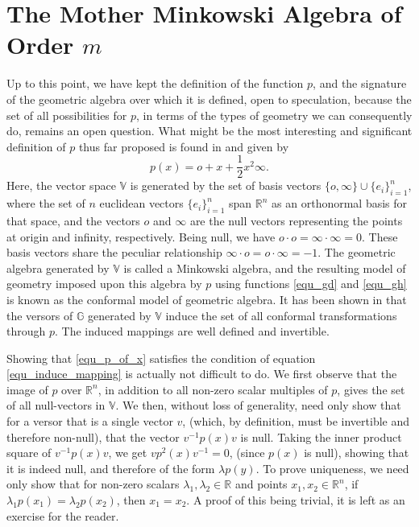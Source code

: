 \documentclass{birkjour}
\theoremstyle{definition}
\theoremstyle{remark}
\numberwithin{equation}{section}
\newcommand{\R}{\mathbb{R}}
\newcommand{\G}{\mathbb{G}}
\newcommand{\V}{\mathbb{V}}
\newcommand{\nvai}{\infty}
\newcommand{\nvao}{o}
\begin{document}
\section{The Mother Minkowski Algebra of Order $m$}

Up to this point, we have kept the definition of the function $p$, and the signature of the
geometric algebra over which it is defined,
open to speculation, because the set of all possibilities for $p$, in terms of the types of geometry
we can consequently do, remains an open question.  What might be the most interesting and significant
definition of $p$ thus far proposed is found in \cite{Hestenes01} and given by
\begin{equation}\label{equ_p_of_x}
p(x)=\nvao + x + \frac{1}{2}x^2\nvai.
\end{equation}
Here, the vector space $\V$ is generated by the set
of basis vectors $\{\nvao,\nvai\}\cup\{e_i\}_{i=1}^n$,
where the set of $n$ euclidean vectors $\{e_i\}_{i=1}^n$ span
$\R^n$ as an orthonormal basis for that space, and the
vectors $\nvao$ and $\nvai$ are the null vectors representing the
points at origin and infinity, respectively.  Being null, we have $\nvao\cdot\nvao=\nvai\cdot\nvai=0$.
These basis vectors share the peculiar relationship $\nvai\cdot\nvao=\nvao\cdot\nvai=-1$.  The geometric
algebra generated by $\V$ is called a Minkowski algebra, and the resulting model of
geometry imposed upon this algebra by $p$ using functions \eqref{equ_gd} and \eqref{equ_gh}
is known as the conformal model of geometric algebra.  It has been shown in
\cite{Hestenes01,LiRockwood01,Dorst07} that
the versors of $\G$ generated by $\V$ induce the set of all conformal transformations through $p$.
The induced mappings are well defined and invertible.

Showing that \eqref{equ_p_of_x} satisfies the condition of equation \eqref{equ_induce_mapping}
is actually not difficult to do.  We first observe that the image of $p$ over $\R^n$, in addition
to all non-zero scalar multiples of $p$, gives the
set of all null-vectors in $\V$.  We then, without loss of generality, need only show that for a versor that is a single
vector $v$, (which, by definition, must be invertible and therefore non-null), that the
vector $v^{-1}p(x)v$ is null.  Taking the inner product square of $v^{-1}p(x)v$,
we get $vp^2(x)v^{-1}=0$, (since $p(x)$ is null), showing that it is indeed null, and therefore
of the form $\lambda p(y)$.  To prove uniqueness, we need only show that for non-zero
scalars $\lambda_1,\lambda_2\in\R$ and points $x_1,x_2\in\R^n$, if $\lambda_1p(x_1)=\lambda_2p(x_2)$,
then $x_1=x_2$.  A proof of this being trivial, it is left as an exercise for the reader.
\end{document}
